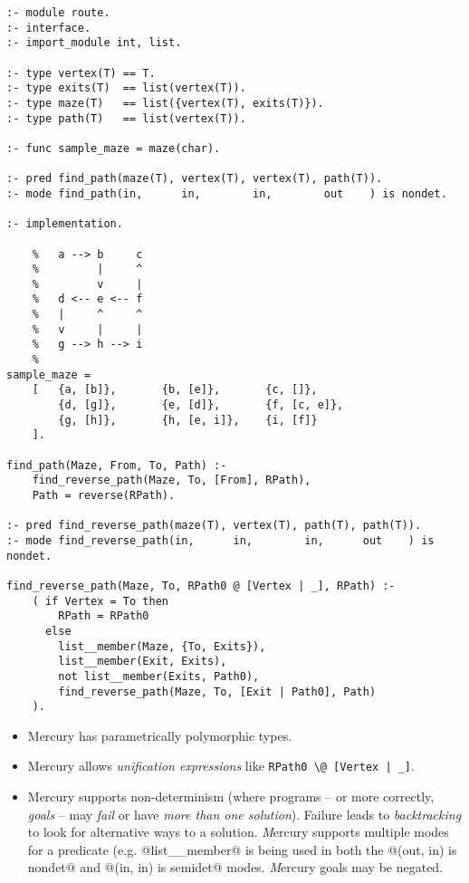 \begin{verbatim}
:- module route.
:- interface.
:- import_module int, list.

:- type vertex(T) == T.
:- type exits(T)  == list(vertex(T)).
:- type maze(T)   == list({vertex(T), exits(T)}).
:- type path(T)   == list(vertex(T)).

:- func sample_maze = maze(char).

:- pred find_path(maze(T), vertex(T), vertex(T), path(T)).
:- mode find_path(in,      in,        in,        out    ) is nondet.

:- implementation.

    %   a --> b     c
    %         |     ^
    %         v     |
    %   d <-- e <-- f
    %   |     ^     ^
    %   v     |     |
    %   g --> h --> i
    %
sample_maze =
    [   {a, [b]},       {b, [e]},       {c, []},
        {d, [g]},       {e, [d]},       {f, [c, e]},
        {g, [h]},       {h, [e, i]},    {i, [f]}
    ].

find_path(Maze, From, To, Path) :-
    find_reverse_path(Maze, To, [From], RPath),
    Path = reverse(RPath).

:- pred find_reverse_path(maze(T), vertex(T), path(T), path(T)).
:- mode find_reverse_path(in,      in,        in,      out    ) is nondet.

find_reverse_path(Maze, To, RPath0 @ [Vertex | _], RPath) :-
    ( if Vertex = To then
        RPath = RPath0
      else
        list__member(Maze, {To, Exits}),
        list__member(Exit, Exits),
        not list__member(Exits, Path0),
        find_reverse_path(Maze, To, [Exit | Path0], Path)
    ).
\end{verbatim}
\begin{itemize}
\item Mercury has parametrically polymorphic types.
\item Mercury allows \emph{unification expressions} like
\verb!RPath0 \@ [Vertex | _]!.
\item Mercury supports non-determinism (where programs -- or more
correctly, \emph{goals} -- may \emph{fail}
or have \emph{more than one solution}).  Failure leads to
\emph{backtracking} to look for alternative ways to a solution.
\emph Mercury supports multiple modes for a predicate (e.g.
@list__member@ is being used in both the @(out, in) is nondet@ and
@(in, in) is semidet@ modes.
\emph Mercury goals may be negated.
\end{itemize}

